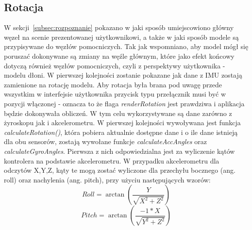 	\subsection{Rotacja}
	\label{subsec:rotacja}
	W sekcji~\ref{subsec:rozpoznanie} pokazano w jaki sposób umiejscowiono główny węzeł na scenie prezentowanej użytkownikowi, a także w jaki sposób modele są przypisywane do węzłów pomocniczych. Tak jak wspomniano, aby model mógł się poruszać dokonywane są zmiany na węźle głównym, które jako efekt końcowy dotyczą również węzłów pomocniczych, czyli z perspektywy użytkownika - modelu dłoni. W pierwszej kolejności zostanie pokazane jak dane z IMU zostają zamienione na rotację modelu. Aby rotacja była brana pod uwagę przede wszystkim w interfejsie użytkownika przycisk typu przełącznik musi być w pozycji włączonej - oznacza to że flaga \textit{renderRotation} jest prawdziwa i aplikacja będzie dokonywała obliczeń. W tym celu wykorzystywane są dane zarówno z żyroskopu jak i akcelerometru. W pierwszej kolejności wywoływana jest funkcja \textit{calculateRotation()}, która pobiera aktualnie dostępne dane i o ile dane istnieją dla obu sensorów, zostają wywołane funkcje \textit{calculateAccAngles} oraz \textit{calculateGyroAngles}. Pierwsza z nich odpowiedzialna jest za wyliczenie kątów kontrolera na podstawie akcelerometru. W przypadku akcelerometru dla odczytów X,Y,Z, kąty te mogą zostać wyliczone dla przechyłu bocznego (ang. roll) oraz nachylenia (ang. pitch), przy użyciu następujących wzorów:
	$$
		Roll = \arctan\left(\frac{Y}{\sqrt{X^2 + Z^2}}\right)
	$$$$
		Pitch = \arctan\left(\frac{-1 * X}{\sqrt{Y^2 + Z^2}}\right)
	$$
